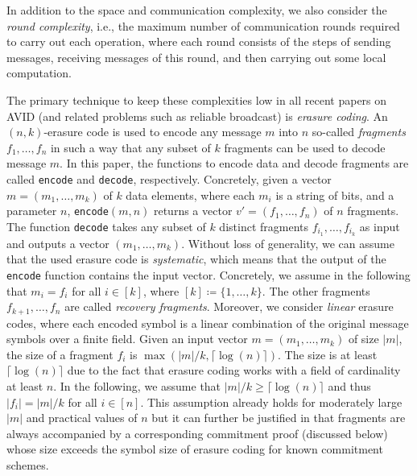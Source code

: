 \documentclass[sigconf,screen]{acmart}
\begin{document}
In addition to the space and communication complexity, we also consider the \emph{round complexity}, i.e., the maximum number of communication rounds required to carry out each operation, where each round consists of the steps of sending messages, receiving messages of this round, and then carrying out some local computation.

The primary technique to keep these complexities low in all recent papers on AVID (and related problems such as reliable broadcast) is \emph{erasure coding}. An $(n, k)$-erasure code is used to encode any message $m$ into $n$ so-called \emph{fragments} $f_1, \ldots, f_n$ in such a way that any subset of $k$ fragments can be used to decode message $m$.
In this paper, the functions to encode data and decode fragments are called \texttt{encode} and \texttt{decode}, respectively.
Concretely, given a vector $m=(m_1,\ldots,m_k)$ of $k$ data elements, where each $m_i$ is a string of bits, and a parameter $n$, \texttt{encode}$(m,n)$ returns a vector $v'=(f_1,\ldots,f_n)$ of $n$ fragments.
The function \texttt{decode} takes any subset of $k$ distinct fragments $f_{i_1},\ldots, f_{i_k}$ as input and outputs a vector $(m_1,\ldots,m_k)$.
Without loss of generality, we can assume that the used erasure code is \emph{systematic}, which means that the output of the \texttt{encode} function contains the input vector. Concretely, we assume in the following that $m_i = f_i$ for all $i \in [k]$, where $[k] \coloneqq \{1,\ldots, k\}$. The other fragments $f_{k+1},\ldots, f_n$ are called \emph{recovery fragments}.
Moreover, we consider \emph{linear} erasure codes, where each encoded symbol is a linear combination of the original message symbols over a finite field. 
Given an input vector $m=(m_1,\ldots,m_k)$ of size $|m|$, the size of a fragment $f_i$ is $\max(|m|/k,\lceil\log(n)\rceil)$. The size is at least $\lceil\log(n)\rceil$ due to the fact that erasure coding works with a field of cardinality at least $n$. In the following, we assume that $|m|/k \ge \lceil\log(n)\rceil$ and thus $|f_i| = |m|/k$ for all $i \in [n]$. This assumption already holds for moderately large $|m|$ and practical values of $n$ but it can further be justified in that fragments are always accompanied by a corresponding commitment proof (discussed below) whose size exceeds the symbol size of erasure coding for known commitment schemes.
\end{document}
